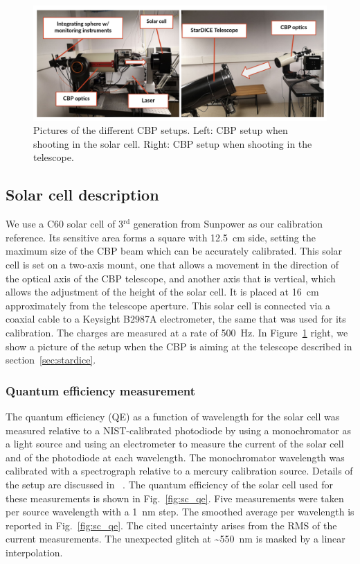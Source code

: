 \begin{figure}[ht]
\centering
\includegraphics[width=\textwidth]{fig/cbp_setup_cropped.pdf}
\caption{Pictures of the different CBP setups. Left: CBP setup when shooting in the solar cell. Right: CBP setup when shooting in the \SD telescope.}
\label{fig:cbp_setup}
\end{figure}

\subsection{Solar cell description}
\label{sec:solarcell}

We use a C60 solar cell of 3$^{\mathrm{rd}}$ generation from Sunpower as our calibration reference. Its sensitive area forms a square with \SI{12.5}{\centi\meter} side, setting the maximum size of the CBP beam which can be accurately calibrated. This solar cell is set on a two-axis mount, one that allows a movement in the direction of the optical axis of the CBP telescope, and another axis that is vertical, which allows the adjustment of the height of the solar cell. It is placed at \SI{16}{\cm} approximately from the telescope aperture. This solar cell is connected via a coaxial cable to a Keysight B2987A electrometer, the same that was used for its calibration. The charges are measured at a rate of \SI{500}{\hertz}. In Figure~\ref{fig:cbp_setup} right, we show a picture of the setup when the CBP is aiming at the \SD telescope described in section~\ref{sec:stardice}.


\subsubsection{Quantum efficiency measurement}
 
The quantum efficiency (QE) as a function of wavelength for the solar cell was measured relative to a NIST-calibrated photodiode by using a monochromator as a light source and using an electrometer to measure the current of the solar cell and of the photodiode at each wavelength. The monochromator wavelength was calibrated with a spectrograph relative to a mercury calibration source. Details of the setup are discussed in ~\cite{solarcell}. The quantum efficiency of the solar cell used for these measurements is shown in Fig.~\ref{fig:sc_qe}. Five measurements were taken per source wavelength with a \SI{1}{\nm} step. The smoothed average per wavelength is reported in Fig.~\ref{fig:sc_qe}. The cited uncertainty arises from the RMS of the current measurements. The unexpected glitch at \textasciitilde\SI{550}{\nm} is masked by a linear interpolation. 

